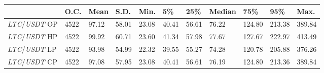 \begin{tabular}{lllllllllll}
\toprule
 & \textbf{O.C.} & \textbf{Mean} & \textbf{S.D.} & \textbf{Min.} & \textbf{5\%} & \textbf{25\%} & \textbf{Median} & \textbf{75\%} & \textbf{95\%} & \textbf{Max.} \\
\midrule
\emph{LTC}/\emph{USDT} OP & 4522 & 97.12 & 58.01 & 23.08 & 40.41 & 56.61 & 76.22 & 124.80 & 213.38 & 389.84 \\
\emph{LTC}/\emph{USDT} HP & 4522 & 99.92 & 60.71 & 23.60 & 41.34 & 57.98 & 77.67 & 127.67 & 222.97 & 413.49 \\
\emph{LTC}/\emph{USDT} LP & 4522 & 93.98 & 54.99 & 22.32 & 39.55 & 55.27 & 74.28 & 120.78 & 205.88 & 376.26 \\
\emph{LTC}/\emph{USDT} CP & 4522 & 97.08 & 57.95 & 23.08 & 40.41 & 56.61 & 76.19 & 124.80 & 213.36 & 389.84 \\
\bottomrule
\end{tabular}
